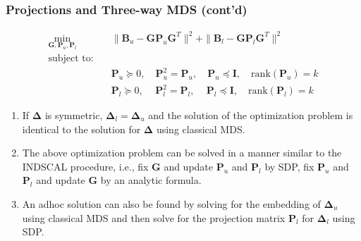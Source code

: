 \documentclass[professionalfonts,hyperref={pdfpagelabels=false,colorlinks=true,linkcolor=blue}]{beamer}
\begin{document}
\begin{frame}
  \frametitle{Projections and Three-way MDS (cont'd)}
  \begin{align*}
    \min_{\mathbf{G},\mathbf{P}_u,\mathbf{P}_l} & \quad \| \mathbf{B}_u -
    \mathbf{G}\mathbf{P}_u \mathbf{G}^{T} \|^2 + \| \mathbf{B}_{l} -
    \mathbf{G}\mathbf{P}_l \mathbf{G}^{T} \|^2 \\
    \text{subject to:} & \\
    & \quad \mathbf{P}_u \succeq 0, \quad \mathbf{P}_{u}^2 = \mathbf{P}_u,
    \quad \mathbf{P}_u \preceq \mathbf{I}, \quad
    \mathrm{rank}(\mathbf{P}_u) = k\tag{*} \\
    & \quad \mathbf{P}_l \succeq 0, \, \quad \mathbf{P}_{l}^2 = \mathbf{P}_l,
    \, \quad \mathbf{P}_l \preceq \mathbf{I}, \quad
    \mathrm{rank}(\mathbf{P}_l) = k \tag{**}
  \end{align*}
  \begin{enumerate}
  \item If $\bm{\Delta}$ is symmetric, $\bm{\Delta}_l = \bm{\Delta}_u$
    and the solution of the optimization problem is identical to
    the solution for $\bm{\Delta}$ using classical MDS.
  \item The above optimization problem can be solved in a manner
    similar to the INDSCAL procedure, i.e., fix $\mathbf{G}$ and update
    $\mathbf{P}_u$ and $\mathbf{P}_l$ by SDP, fix $\mathbf{P}_{u}$ and
    $\mathbf{P}_l$ and update $\mathbf{G}$ by an analytic formula.
  \item An adhoc solution can also be found by solving for the
    embedding of $\bm{\Delta}_{u}$ using classical MDS and then solve
    for the projection matrix $\mathbf{P}_l$ for $\bm{\Delta}_l$ using SDP.
  \end{enumerate}
\end{frame}
\end{document}
